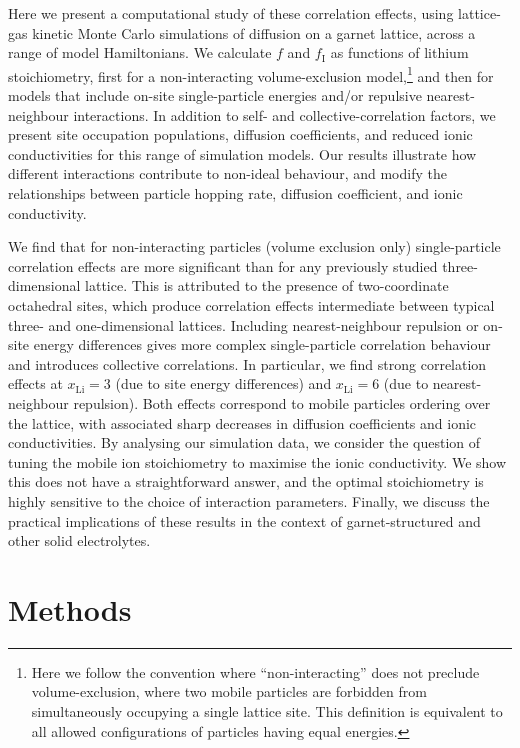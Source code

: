 \documentclass[aps,prb,twocolumn,superscriptaddress,reprint]{revtex4-1}
\newcommand{\xLi}{x_\m{Li}}
\newcommand{\m}[1]{\mathrm{#1}}
\begin{document}
Here we present a computational study of these correlation effects, using lattice-gas kinetic Monte Carlo simulations of diffusion on a garnet lattice, across a range of model Hamiltonians. 
We calculate $f$ and $f_\m{I}$ as functions of lithium stoichiometry, first for a non-interacting volume-exclusion model,\footnote{Here we follow the convention where ``non-interacting'' does not preclude volume-exclusion, where two mobile particles are forbidden from simultaneously occupying a single lattice site.\cite{Kutner_PhysLett1981} This definition is equivalent to all allowed configurations of particles having equal energies.} and then for models that include on-site single-particle energies and/or repulsive nearest-neighbour interactions. 
In addition to self- and collective-correlation factors, we present site occupation populations, diffusion coefficients, and reduced ionic conductivities for this range of simulation models. Our results illustrate how different interactions contribute to non-ideal behaviour, and modify the relationships between particle hopping rate, diffusion coefficient, and ionic conductivity. 

We find that for non-interacting particles (volume exclusion only) single-particle correlation effects are more significant than for any previously studied three-dimensional lattice. This is attributed to the presence of two-coordinate octahedral sites, which produce correlation effects intermediate between typical three- and one-dimensional lattices. Including nearest-neighbour repulsion or on-site energy differences gives more complex single-particle correlation behaviour and introduces collective correlations. In particular, we find strong correlation effects at $\xLi=3$ (due to site energy differences) and $\xLi=6$ (due to nearest-neighbour repulsion). Both effects correspond to mobile particles ordering over the lattice, with associated sharp decreases in diffusion coefficients and ionic conductivities. By analysing our simulation data, we consider the question of tuning the mobile ion stoichiometry to maximise the ionic conductivity. We show this does not have a straightforward answer, and the optimal stoichiometry is highly sensitive to the choice of interaction parameters. Finally, we discuss the practical implications of these results in the context of garnet-structured and other solid electrolytes.

\section{Methods}
\end{document}
